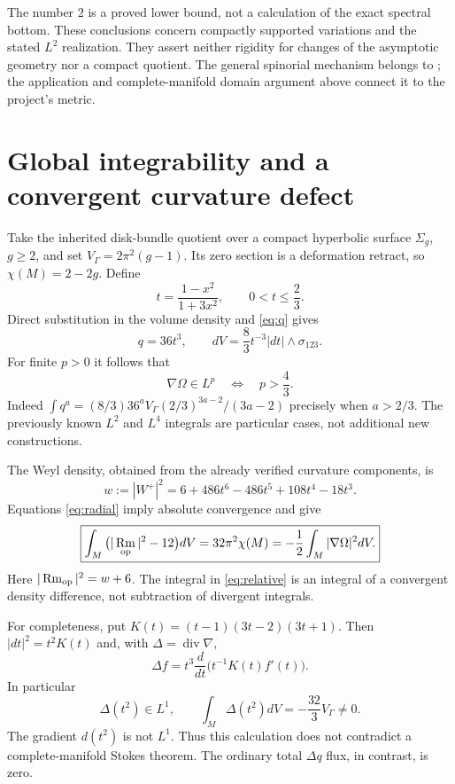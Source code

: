 \documentclass[11pt]{article}
\DeclareMathOperator{\Rm}{Rm}
\begin{document}
The number $2$ is a proved lower bound, not a calculation of the exact spectral bottom. These conclusions concern compactly supported variations and the stated $L^2$ realization. They assert neither rigidity for changes of the asymptotic geometry nor a compact quotient. The general spinorial mechanism belongs to \cite{Artacho25,Artacho26}; the application and complete-manifold domain argument above connect it to the project's metric.

\section{Global integrability and a convergent curvature defect}
Take the inherited disk-bundle quotient over a compact hyperbolic surface $\Sigma_g$, $g\ge2$, and set $V_\Gamma=2\pi^2(g-1)$. Its zero section is a deformation retract, so $\chi(M)=2-2g$. Define
\[
 t=\frac{1-x^2}{1+3x^2},\qquad 0<t\le\frac23.
\]
Direct substitution in the volume density and \eqref{eq:q} gives
\begin{equation}\label{eq:radial}
 q=36t^3,\qquad dV=\frac83t^{-3}|dt|\wedge\sigma_{123}.
\end{equation}
For finite $p>0$ it follows that
\begin{equation}\label{eq:lp}
 \nabla\Omega\in L^p\quad\Longleftrightarrow\quad p>\frac43.
\end{equation}
Indeed $\int q^a=(8/3)36^aV_\Gamma(2/3)^{3a-2}/(3a-2)$ precisely when $a>2/3$. The previously known $L^2$ and $L^4$ integrals are particular cases, not additional new constructions.

The Weyl density, obtained from the already verified curvature components, is
\[
 w:=|W^+|^2=6+486t^6-486t^5+108t^4-18t^3.
\]
Equations \eqref{eq:radial} imply absolute convergence and give
\begin{equation}\label{eq:relative}
 \boxed{\int_M\big(|\Rm_{\rm op}|^2-12\big)dV
 =32\pi^2\chi(M)=-\frac12\int_M|\nabla\Omega|^2dV.}
\end{equation}
Here $|\Rm_{\rm op}|^2=w+6$. The integral in \eqref{eq:relative} is an integral of a convergent density difference, not subtraction of divergent integrals.

For completeness, put $K(t)=(t-1)(3t-2)(3t+1)$. Then $|dt|^2=t^2K(t)$ and, with $\Delta=\operatorname{div}\nabla$,
\[
 \Delta f=t^3\frac{d}{dt}\big(t^{-1}K(t)f'(t)\big).
\]
In particular
\[
 \Delta(t^2)\in L^1,\qquad
 \int_M\Delta(t^2)dV=-\frac{32}{3}V_\Gamma\ne0.
\]
The gradient $d(t^2)$ is not $L^1$. Thus this calculation does not contradict a complete-manifold Stokes theorem. The ordinary total $\Delta q$ flux, in contrast, is zero.
\end{document}
